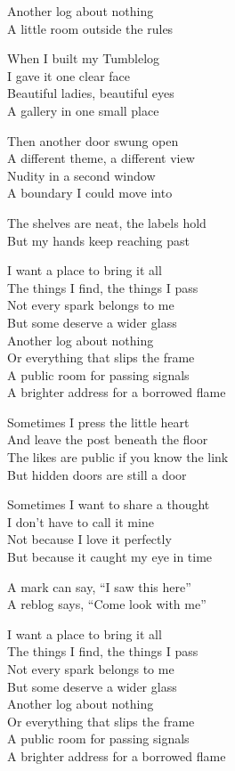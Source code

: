 \begin{lyrics}
Another log about nothing\\
A little room outside the rules

When I built my Tumblelog\\
I gave it one clear face\\
Beautiful ladies, beautiful eyes\\
A gallery in one small place

Then another door swung open\\
A different theme, a different view\\
Nudity in a second window\\
A boundary I could move into

The shelves are neat, the labels hold\\
But my hands keep reaching past

I want a place to bring it all\\
The things I find, the things I pass\\
Not every spark belongs to me\\
But some deserve a wider glass\\
Another log about nothing\\
Or everything that slips the frame\\
A public room for passing signals\\
A brighter address for a borrowed flame

Sometimes I press the little heart\\
And leave the post beneath the floor\\
The likes are public if you know the link\\
But hidden doors are still a door

Sometimes I want to share a thought\\
I don’t have to call it mine\\
Not because I love it perfectly\\
But because it caught my eye in time

A mark can say, “I saw this here”\\
A reblog says, “Come look with me”

I want a place to bring it all\\
The things I find, the things I pass\\
Not every spark belongs to me\\
But some deserve a wider glass\\
Another log about nothing\\
Or everything that slips the frame\\
A public room for passing signals\\
A brighter address for a borrowed flame


\end{lyrics}
